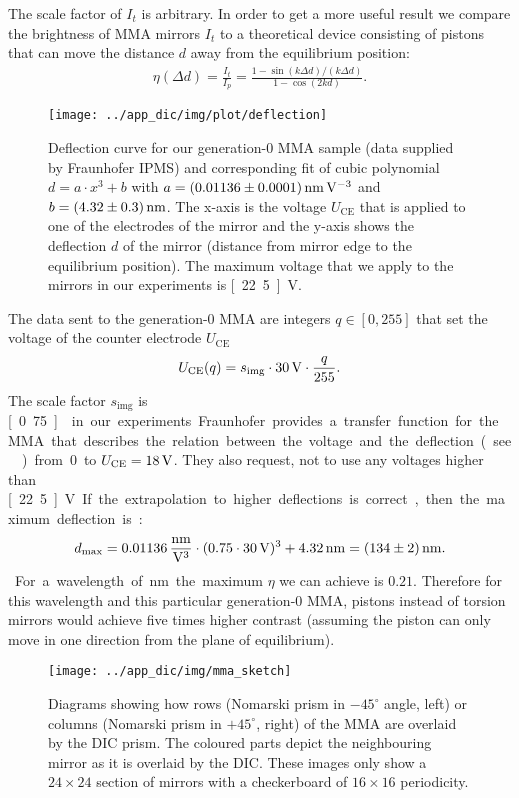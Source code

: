 The scale factor of $I_t$ is arbitrary. In order to get a more useful
result we compare the brightness of MMA mirrors $I_t$ to a theoretical
device consisting of pistons that can move the distance $d$ away from
the equilibrium position:
\begin{align}
\label{eqn:eta}
  \eta(\Delta d)=\frac{I_t}{I_p}=\frac{1-\sin(k\Delta d)/(k\Delta d)}{1-\cos(2kd)}.
\end{align}
\begin{figure}[ht]
  \centering
  \texttt{[image: ../app\_dic/img/plot/deflection]}
  \caption{Deflection curve for our generation-0 MMA sample (data
    supplied by Fraunhofer IPMS) and corresponding fit of cubic
    polynomial $d=a\cdot x^3+b$ with $a=\unit[(0.01136\pm0.0001)]{nm\,
      V^{-3}}$ and $b=\unit[(4.32\pm0.3)]{nm}$. The x-axis is the
    voltage $U_\textrm{CE}$ that is applied to one of the electrodes
    of the mirror and the y-axis shows the deflection $d$ of the
    mirror (distance from mirror edge to the equilibrium
    position). The maximum voltage that we apply to the mirrors in our
    experiments is \unit[22.5]{V}.}
  \label{fig:deflection}
\end{figure}
The data sent to the generation-0 MMA are integers $q\in[0,255]$
that set the voltage of the counter electrode $U_\textrm{CE}$
\begin{align}
U_\textrm{CE}(q)=s_\textrm{img}\cdot \unit[30]{V} \cdot \frac{q}{255}.
\end{align}
The scale factor $s_\textrm{img}$ is \unit[0.75]{} in our experiments.
Fraunhofer provides a transfer function for the MMA that describes the
relation between the voltage and the deflection (see
) from 0 to $U_\textrm{CE}=\unit[18]{V}$. They
also request, not to use any voltages higher than \unit[22.5]{V}. If
the extrapolation to higher deflections is correct, then the maximum
deflection is: %
\begin{align}
\label{eqn:dmax}
d_\textrm{max}=\unit[0.01136]{\frac{nm}{V^3}}\cdot(0.75\cdot\unit[30]{V})^3+\unit[4.32]{nm}
=\unit[(134\pm2)]{nm}.
\end{align}
For a wavelength of \unit[480]{nm} the maximum $\eta$ we can achieve
is $0.21$. Therefore for this wavelength and this particular
generation-0 MMA, pistons instead of torsion mirrors would achieve
five times higher contrast (assuming the piston can only move in one
direction from the plane of equilibrium).
\begin{figure}[ht]
  \centering
  \texttt{[image: ../app\_dic/img/mma\_sketch]}
  \caption{ Diagrams showing how rows (Nomarski prism in $-45^\circ$
    angle, left) or columns (Nomarski prism in $+45^\circ$, right) of
    the MMA are overlaid by the DIC prism. The coloured parts depict
    the neighbouring mirror as it is overlaid by the DIC. These
    images only show a $24\times 24$ section of mirrors with a
    checkerboard of $16\times 16$ periodicity.}
  \label{fig:screen}
\end{figure}
